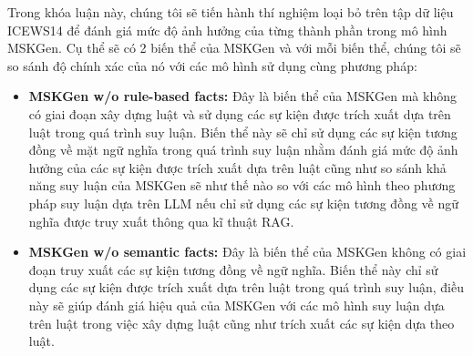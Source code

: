 Trong khóa luận này, chúng tôi sẽ tiến hành thí nghiệm loại bỏ trên tập dữ liệu ICEWS14 để đánh giá mức độ ảnh hưởng của từng thành phần trong mô hình MSKGen. Cụ thể
sẽ có 2 biến thể của MSKGen và với mỗi biến thể, chúng tôi sẽ so sánh độ chính xác của nó với các mô hình sử dụng cùng phương pháp:
\begin{itemize}
    \item \textbf{MSKGen w/o rule-based facts:} Đây là biến thể của MSKGen mà không có giai đoạn xây dựng luật và sử dụng các sự kiện được
    trích xuất dựa trên luật trong quá trình suy luận. Biến thể này sẽ chỉ sử dụng các sự kiện tương đồng về mặt ngữ nghĩa trong quá trình 
    suy luận nhằm đánh giá mức độ ảnh hưởng của các sự kiện được trích xuất dựa trên luật cũng như so sánh khả năng suy luận của MSKGen sẽ như thế 
    nào so với các mô hình theo phương pháp suy luận dựa trên LLM nếu chỉ sử dụng các sự kiện tương đồng về ngữ nghĩa được truy xuất thông qua kĩ thuật RAG.
    \item \textbf{MSKGen w/o semantic facts:} Đây là biến thể của MSKGen không có giai đoạn truy xuất các sự kiện tương đồng về ngữ nghĩa.
    Biến thể này chỉ sử dụng các sự kiện được trích xuất dựa trên luật trong quá trình suy luận, điều này sẽ giúp đánh giá hiệu quả của MSKGen
    với các mô hình suy luận dựa trên luật trong việc xây dựng luật cũng như trích xuất các sự kiện dựa theo luật.
\end{itemize}

